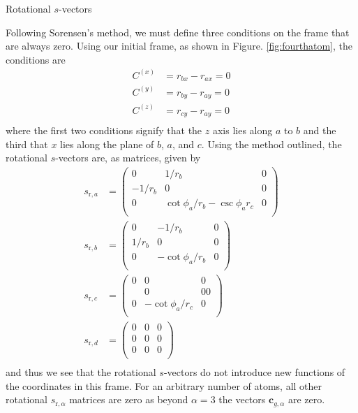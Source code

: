 \documentclass{article}
\newcommand{\fig}[1]{Figure. #1}
\newcommand{\vect}[1]{\boldsymbol{#1}}
\begin{document}
\begin{subsection}{Rotational $s$-vectors}

	Following Sorensen's method, we must define three conditions on the frame that are always zero. Using our initial frame, as shown in \fig{\ref{fig:fourthatom}}, the conditions are 
	\[
		\begin{split}
			C^{(x)} &= r_{bx} - r_{ax} = 0 \\
			C^{(y)} &= r_{by} - r_{ay} = 0 \\
			C^{(z)} &= r_{cy} - r_{ay} = 0 \\
		\end{split}
	\]
	where the first two conditions signify that the $z$ axis lies along $a$ to $b$ and the third that $x$ lies along the plane of $b$, $a$, and $c$. Using the method outlined, the rotational $s$-vectors are, as matrices, given by
	\[
	\begin{split}
		s_{\text{r}, a} &= \begin{pmatrix}
		0 & 1/r_b & 0 \\
			-1/r_b &0 & 0 \\
			0 & \cot \phi_a/ r_b - \csc \phi_a r_c & 0 \\
	\end{pmatrix} \\
		s_{\text{r}, b} &= \begin{pmatrix}
		0 & -1/r_b & 0 \\
		1/r_b & 0 & 0 \\
		0 & -\cot \phi_a /r_b & 0 \\
	\end{pmatrix} \\
		s_{\text{r}, c} &= \begin{pmatrix} 
			0 & 0 & 0 \\
			& 0 & 0 0 \\
			0 & - \cot \phi_a/r_c & 0 \\
		\end{pmatrix} \\
		s_{\text{r}, d} &= \begin{pmatrix}
			0 & 0 & 0 \\
			0 & 0 & 0 \\
			0 & 0 & 0 \\
		\end{pmatrix} \\
	\end{split}
	\]
and thus we see that the rotational $s$-vectors do not introduce new functions of the coordinates in this frame. For an arbitrary number of atoms, all other rotational $s_{\text{r}, \alpha}$ matrices are zero as beyond $\alpha = 3$ the vectors $\vect{c}_{g, \alpha}$ are zero. 
\end{subsection}
\end{document}
